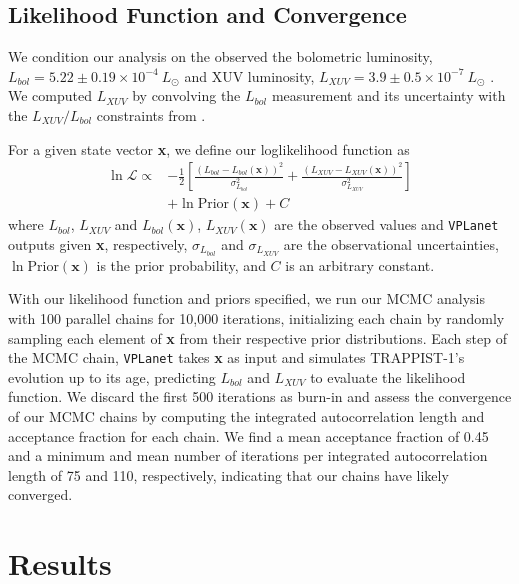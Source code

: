 \documentclass[twocolumn]{aastex62}
\newcommand{\vplanet}[0]{\texttt{VPLanet}\xspace}
\begin{document}
\subsection{Likelihood Function and Convergence}

We condition our analysis on the observed the bolometric luminosity, $L_{bol} = 5.22 \pm{0.19} \times 10^{-4} \ L_{\odot}$ \citep{vanGrootel2018} and XUV luminosity, $L_{XUV} = 3.9 \pm{0.5} \times 10^{-7} \ L_{\odot}$ \citep{Wheatley2017}. We computed $L_{XUV}$ by convolving the \citet{vanGrootel2018} $L_{bol}$ measurement and its uncertainty with the $L_{XUV}/L_{bol}$ constraints from \citet{Wheatley2017}.

For a given state vector \textbf{x}, we define our loglikelihood function as
\small
\begin{equation} \label{eqn:lnlike}
\begin{split}
    \ln \mathcal{L} \propto & -\frac{1}{2} \left[ \frac{(L_{bol} - L_{bol}(\textbf{x}))^2}{\sigma_{L_{bol}}^2} + \frac{(L_{XUV} - L_{XUV}(\textbf{x}))^2}{\sigma_{L_{XUV}}^2} \right] \\
    & + \ln \mathrm{Prior}(\textbf{x}) + C
\end{split}
\end{equation}
\normalsize
where $L_{bol}$, $L_{XUV}$ and $L_{bol}(\textbf{x})$, $L_{XUV}(\textbf{x})$ are the observed values and \vplanet outputs given \textbf{x}, respectively, $\sigma_{L_{bol}}$ and $\sigma_{L_{XUV}}$ are the observational uncertainties, $\ln \mathrm{Prior}(\textbf{x})$ is the prior probability, and $C$ is an arbitrary constant. 

With our likelihood function and priors specified, we run our MCMC analysis with 100 parallel chains for 10,000 iterations, initializing each chain by randomly sampling each element of \textbf{x} from their respective prior distributions. Each step of the MCMC chain, \vplanet takes \textbf{x} as input and simulates TRAPPIST-1's evolution up to its age, predicting $L_{bol}$ and $L_{XUV}$ to evaluate the likelihood function. We discard the first 500 iterations as burn-in and assess the convergence of our MCMC chains by computing the integrated autocorrelation length and acceptance fraction for each chain. We find a mean acceptance fraction of 0.45 and a minimum and mean number of iterations per integrated autocorrelation length of 75 and 110, respectively, indicating that our chains have likely converged.


\section{Results} \label{sec:results}
\end{document}
